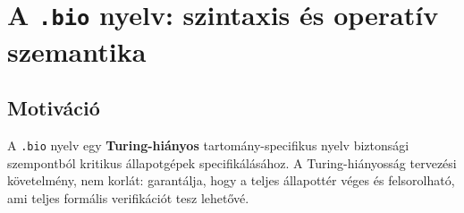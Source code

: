 \documentclass[11pt,a4paper,twoside]{article}
\begin{document}
\begin{abstract}
Bemutatjuk a \textbf{BioOS Kauzális Alkotmányt}, egy kernel-szintű biztonsági
primitívet, amely \emph{kauzális leszármazást} érvényesít a hagyományos
\emph{hozzáférési engedélyek} helyett. A fő állítás: egy rendszerhívás pontosan
akkor engedélyezett, ha egy ellenőrzött kauzális lánc létezik egy fizikai
hardvermegszakítástól (IRQ) a híváshelyig, egy korlátolt időablakban. Ilyen
lánc hiányában a védett erőforrások nem tiltottnak, hanem \emph{nem létezőnek}
tűnnek (\texttt{ENODEV}, \texttt{ECONNREFUSED}). Meghatározzuk a \texttt{.bio}
specifikációs nyelvet kis-lépéses operatív szemantikával, kimondják az eBPF/LSM
fordítói korrektségi tételt, és biszimulációs eredményt bizonyítunk egy JavaScript
böngészőemulátor (\texttt{bio\_kernel\_emu}) és a kernelimplementáció
(\textit{DCC Ring~0}) között. Mind a hat biztonsági invariánst formálisan
verifikáljuk a Z3 SMT-megoldóval (megsértés $\Rightarrow$ \textsc{unsat}).
Az implementáció élesben fut Linux~6.1 kernelen, hat eBPF-programmal csatolva
\texttt{raw\_tracepoint} és LSM hookokhoz.

Ezek a garanciák szoftveres támadóra vonatkoznak a kernel határán (fájl-,
hálózati és exec rendszerhívások). Fizikai behatolás, firmware- vagy
bootloader-módosítás és nem rendszeren belüli lemezhozzáférés kívül esik a
modellen. Ugyanakkor minden szoftveres támadás, amely eléri a DCCRing0Guard
interfészeit -- függetlenül attól, hogy korábban kompromittált környezetből
érkezik-e -- ugyanazoknak a kauzális invariánsoknak van alávetve, és érvényes
fizikai kauzális lánc hiányában blokkolódik.
\end{abstract}

\newpage
\tableofcontents
\newpage

\section{A \texttt{.bio} nyelv: szintaxis és operatív szemantika}

\subsection{Motiváció}

A \texttt{.bio} nyelv egy \textbf{Turing-hiányos} tartomány-specifikus nyelv
biztonsági szempontból kritikus állapotgépek specifikálásához.
A Turing-hiányosság tervezési követelmény, nem korlát: garantálja, hogy a
teljes állapottér véges és felsorolható, ami teljes formális verifikációt tesz lehetővé.
\end{document}
